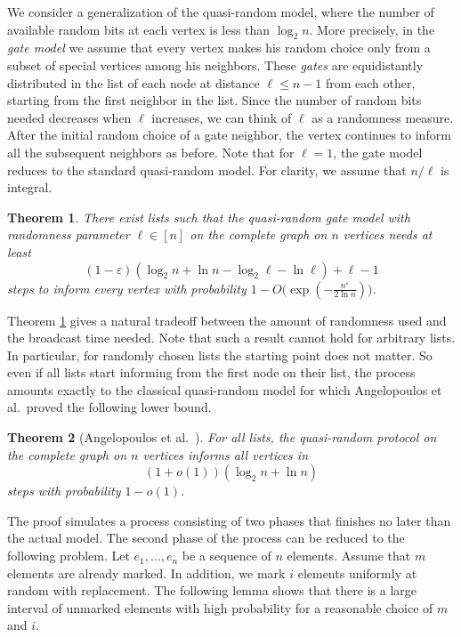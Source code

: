 \documentclass{article}
\newtheorem{thm}{Theorem}
\begin{document}
We consider a generalization of the quasi-random model, where the number of available random bits at each vertex is less than $\log_2 n$.
More precisely, in the \textit{gate model} we assume that every vertex makes his random choice only from a subset of special vertices among his neighbors. These \textit{gates} are equidistantly distributed in the list of each node at distance $\ell \leq  n-1 $ from each other, starting from the first neighbor in the list. Since the number of random bits needed decreases when $\ell$ increases, we can think of $\ell$ as a randomness measure. After the initial random choice of a gate neighbor, the vertex continues to inform all the subsequent neighbors as before. Note that for $\ell = 1$, the gate model reduces to the standard quasi-random model. For clarity, we assume that $n/\ell$ is integral.
\begin{thm}
\label{lowerbound_gatemodel}
There exist lists such that the quasi-random gate model with randomness parameter $\ell \in [n]$ on the complete graph on $n$ vertices needs at least
	\begin{equation*}
	  (1-\varepsilon) (\log_2 n + \ln n - \log_2 \ell - \ln \ell)+\ell-1 
	\end{equation*}
steps to inform every vertex with probability $1-O\bigl(\exp(-\frac{n^\varepsilon}{2\ln n})\bigr)$.
\end{thm}
Theorem \ref{lowerbound_gatemodel} gives a natural tradeoff between the amount of randomness used and the broadcast time needed. Note that such a result cannot hold for arbitrary lists. In particular, for randomly chosen lists the starting point does not matter. So even if all lists start informing from the first node on their list, the process amounts exactly to the classical quasi-random model for which Angelopoulos et al.~proved the following lower bound.
\begin{thm}[Angelopoulos et al.~\cite{ADHP09}]
 For all lists, the quasi-random protocol on the complete graph on $n$ vertices informs all vertices in 
\begin{equation*}
 (1+o(1))(\log_2 n + \ln n)
\end{equation*}
steps with probability $1-o(1)$.
\end{thm}

  



The proof simulates a process consisting of two phases that finishes no later than the actual model. The second phase of the process can be reduced to the following problem.  Let $e_1,\dots, e_n$ be a sequence of $n$ elements. Assume that $m$ elements are already marked. In addition, we mark $i$ elements uniformly at random with replacement. The following lemma shows that there is a large interval of unmarked elements with high probability for a reasonable choice of $m$ and $i$. 
\end{document}
